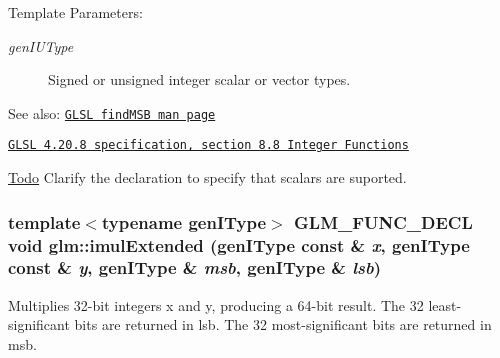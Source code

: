 \begin{Desc}
\item[Template Parameters:]
\begin{description}
\item[{\em genIUType}]Signed or unsigned integer scalar or vector types.\end{description}
\end{Desc}
\begin{Desc}
\item[See also:]\href{http://www.opengl.org/sdk/docs/manglsl/xhtml/findMSB.xml}{\tt GLSL findMSB man page} 

\href{http://www.opengl.org/registry/doc/GLSLangSpec.4.20.8.pdf}{\tt GLSL 4.20.8 specification, section 8.8 Integer Functions}\end{Desc}
\begin{Desc}
\item[\hyperlink{todo__todo000047}{Todo}]Clarify the declaration to specify that scalars are suported. \end{Desc}
\hypertarget{group__core__func__integer_g2f837b25b019b4dfacc4091a3a45c4b9}{
\subsubsection[imulExtended]{\setlength{\rightskip}{0pt plus 5cm}template$<$typename genIType$>$ GLM\_\-FUNC\_\-DECL void glm::imulExtended (genIType const \& {\em x}, \/  genIType const \& {\em y}, \/  genIType \& {\em msb}, \/  genIType \& {\em lsb})}}
\label{group__core__func__integer_g2f837b25b019b4dfacc4091a3a45c4b9}


Multiplies 32-bit integers x and y, producing a 64-bit result. The 32 least-significant bits are returned in lsb. The 32 most-significant bits are returned in msb.

